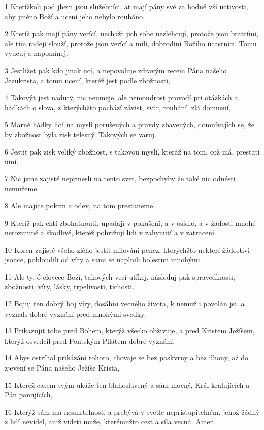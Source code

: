 \par 1 Kterížkoli pod jhem jsou služebníci, at mají pány své za hodné vší uctivosti, aby jméno Boží a ucení jeho nebylo rouháno.
\par 2 Kteríž pak mají pány verící, nechažt jich sobe nezlehcují, protože jsou bratrími, ale tím radeji slouží, protože jsou verící a milí, dobrodiní Božího úcastníci. Tomu vyucuj a napomínej.
\par 3 Jestližet pak kdo jinak ucí, a nepovoluje zdravým recem Pána našeho Jezukrista, a tomu ucení, kteréž jest podle zbožnosti,
\par 4 Takovýt jest nadutý, nic neumeje, ale nemoudrost provodí pri otázkách a hádkách o slova, z kterýchžto pochází závist, svár, rouhání, zlá domnení,
\par 5 Marné hádky lidí na mysli porušených a pravdy zbavených, domnívajích se, že by zbožnost byla zisk telesný. Takových se varuj.
\par 6 Jestit pak zisk veliký zbožnost, s takovou myslí, kteráž na tom, což má, prestati umí.
\par 7 Nic jsme zajisté neprinesli na tento svet, bezpochyby že také nic odnésti nemužeme.
\par 8 Ale majíce pokrm a odev, na tom prestaneme.
\par 9 Kteríž pak chtí zbohatnouti, upadají v pokušení, a v osidlo, a v žádosti mnohé nerozumné a škodlivé, kteréž pohrižují lidi v zahynutí a v zatracení.
\par 10 Koren zajisté všeho zlého jestit milování penez, kterýchžto nekterí žádostivi jsouce, pobloudili od víry a sami se naplnili bolestmi mnohými.
\par 11 Ale ty, ó clovece Boží, takových vecí utíkej, následuj pak spravedlnosti, zbožnosti, víry, lásky, trpelivosti, tichosti.
\par 12 Bojuj ten dobrý boj víry, dosáhni vecného života, k nemuž i povolán jsi, a vyznals dobré vyznání pred mnohými svedky.
\par 13 Prikazujit tobe pred Bohem, kterýž všecko obživuje, a pred Kristem Ježíšem, kterýž osvedcil pred Pontským Pilátem dobré vyznání,
\par 14 Abys ostríhal prikázání tohoto, chovaje se bez poskvrny a bez úhony, až do zjevení se Pána našeho Ježíše Krista,
\par 15 Kteréž casem svým ukáže ten blahoslavený a sám mocný, Král kralujících a Pán panujících,
\par 16 Kterýž sám má nesmrtelnost, a prebývá v svetle nepristupitelném, jehož žádný z lidí nevidel, aniž videti muže, kterémužto cest a síla vecná. Amen.

